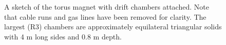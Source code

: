 \begin{figure}[htpb]
\vspace{6.7cm} 
\caption{\small{A sketch of the torus magnet with drift chambers attached.
Note that cable runs and gas lines have been removed for clarity.  The largest
(R3) chambers are approximately equilateral triangular solids with 4 m long sides
and 0.8 m depth.}}
\label{chambers-and-torus}
\end{figure}
















































